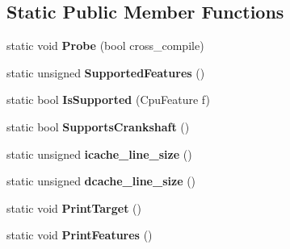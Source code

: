 \subsection*{Static Public Member Functions}
\begin{DoxyCompactItemize}
\item 
static void {\bfseries Probe} (bool cross\+\_\+compile)\hypertarget{classv8_1_1internal_1_1_cpu_features_a81ae78f6f799c911bf55ca0e4099b6aa}{}\label{classv8_1_1internal_1_1_cpu_features_a81ae78f6f799c911bf55ca0e4099b6aa}

\item 
static unsigned {\bfseries Supported\+Features} ()\hypertarget{classv8_1_1internal_1_1_cpu_features_a481a85a8743cc9ef2303e3d9d58d4869}{}\label{classv8_1_1internal_1_1_cpu_features_a481a85a8743cc9ef2303e3d9d58d4869}

\item 
static bool {\bfseries Is\+Supported} (Cpu\+Feature f)\hypertarget{classv8_1_1internal_1_1_cpu_features_a44305c4c7840c90b5cf4a0b6ebd791af}{}\label{classv8_1_1internal_1_1_cpu_features_a44305c4c7840c90b5cf4a0b6ebd791af}

\item 
static bool {\bfseries Supports\+Crankshaft} ()\hypertarget{classv8_1_1internal_1_1_cpu_features_a8209a08c12787f6e465dcb53c193a476}{}\label{classv8_1_1internal_1_1_cpu_features_a8209a08c12787f6e465dcb53c193a476}

\item 
static unsigned {\bfseries icache\+\_\+line\+\_\+size} ()\hypertarget{classv8_1_1internal_1_1_cpu_features_ac676ee97ad12a0fda46389cd57c23844}{}\label{classv8_1_1internal_1_1_cpu_features_ac676ee97ad12a0fda46389cd57c23844}

\item 
static unsigned {\bfseries dcache\+\_\+line\+\_\+size} ()\hypertarget{classv8_1_1internal_1_1_cpu_features_ab2552a12f4ef4f13591b303696db29b9}{}\label{classv8_1_1internal_1_1_cpu_features_ab2552a12f4ef4f13591b303696db29b9}

\item 
static void {\bfseries Print\+Target} ()\hypertarget{classv8_1_1internal_1_1_cpu_features_a9db700f7f56524d827e19fd44ef7a07e}{}\label{classv8_1_1internal_1_1_cpu_features_a9db700f7f56524d827e19fd44ef7a07e}

\item 
static void {\bfseries Print\+Features} ()\hypertarget{classv8_1_1internal_1_1_cpu_features_a9b099faa5af8ce6e4e6d455590c14189}{}\label{classv8_1_1internal_1_1_cpu_features_a9b099faa5af8ce6e4e6d455590c14189}

\end{DoxyCompactItemize}
